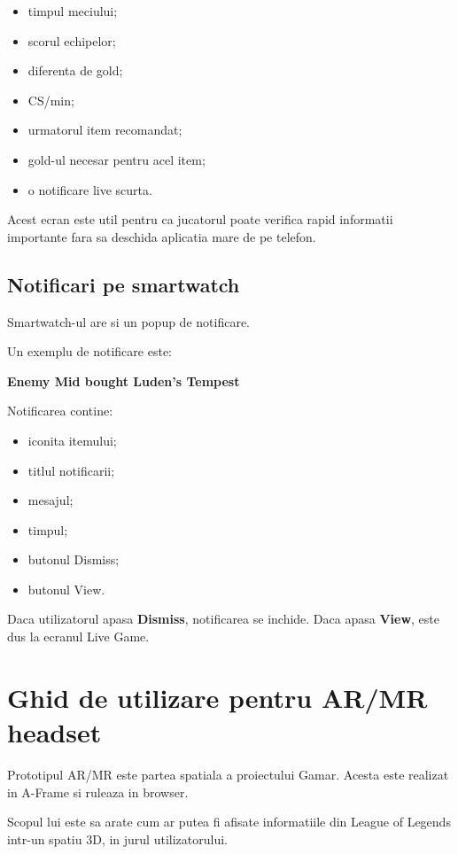 \documentclass[12pt,a4paper]{article}
\begin{document}
\begin{itemize}
    \item timpul meciului;
    \item scorul echipelor;
    \item diferenta de gold;
    \item CS/min;
    \item urmatorul item recomandat;
    \item gold-ul necesar pentru acel item;
    \item o notificare live scurta.
\end{itemize}

Acest ecran este util pentru ca jucatorul poate verifica rapid informatii importante fara sa deschida aplicatia mare de pe telefon.

\subsection{Notificari pe smartwatch}

Smartwatch-ul are si un popup de notificare.

Un exemplu de notificare este:

\begin{center}
    \textbf{Enemy Mid bought Luden's Tempest}
\end{center}

Notificarea contine:

\begin{itemize}
    \item iconita itemului;
    \item titlul notificarii;
    \item mesajul;
    \item timpul;
    \item butonul Dismiss;
    \item butonul View.
\end{itemize}

Daca utilizatorul apasa \textbf{Dismiss}, notificarea se inchide. Daca apasa \textbf{View}, este dus la ecranul Live Game.

\section{Ghid de utilizare pentru AR/MR headset}

Prototipul AR/MR este partea spatiala a proiectului Gamar. Acesta este realizat in A-Frame si ruleaza in browser.

Scopul lui este sa arate cum ar putea fi afisate informatiile din League of Legends intr-un spatiu 3D, in jurul utilizatorului.
\end{document}
